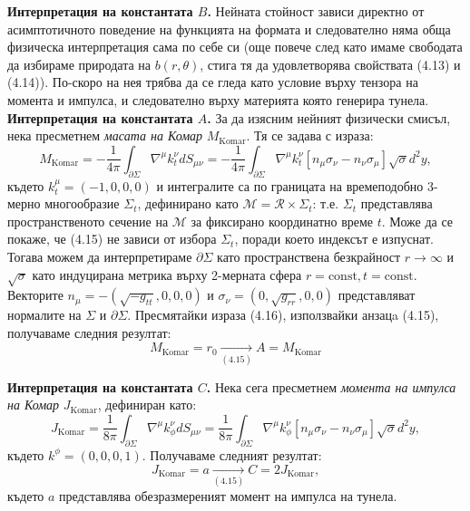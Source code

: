 \noindent\textbf{Интерпретация на константата $B$.} Нейната стойност зависи директно от асимптотичното поведение на функцията на формата и следователно няма обща физическа интерпретация сама по себе си (още повече след като имаме свободата да избираме природата на $b(r,\theta)$, стига тя да удовлетворява свойствата (4.13) и (4.14)). По-скоро на нея трябва да се гледа като условие върху тензора на момента и импулса, и следователно върху материята която генерира тунела.\\

\noindent\textbf{Интерпретация на константата $A$.} За да изясним нейният физически смисъл, нека пресметнем \emph{масата на Комар} $M_{\text{Komar}}$. Тя се задава с израза:
\begin{equation}
	M_{\text{Komar}} = -\frac{1}{4\pi}\int_{\partial\Sigma}\nabla^\mu k^\nu_t dS_{\mu\nu} =  -\frac{1}{4\pi}\int_{\partial\Sigma}\nabla^\mu k^\nu_t\left[n_\mu\sigma_\nu - n_\nu\sigma_\mu\right] \sqrt{\sigma}d^2y,
\end{equation}
където $k^\mu_t = (-1,0,0,0)$ и интегралите са по границата на времеподобно 3-мерно многообразие $\Sigma_t$, дефинирано като $\mathcal{M} = \mathcal{R} \times \Sigma_t$: т.е. $\Sigma_t$ представлява пространственото сечение на $\mathcal{M}$ за фиксирано координатно време $t$. Може да се покаже, че (4.15) не зависи от избора $\Sigma_t$, поради което индексът е изпуснат. Тогава можем да интерпретираме $\partial\Sigma$ като пространствена безкрайност $r\rightarrow\infty$ и $\sqrt{\sigma}$ като индуцирана метрика върху 2-мерната сфера $r = \text{const}, t = \text{const}$. Векторите $n_\mu = - (\sqrt{-g_{tt}}, 0, 0, 0)$ и $\sigma_\nu = (0, \sqrt{g_{rr}},0 ,0)$ представляват нормалите на $\Sigma$ и $\partial\Sigma$. Пресмятайки израза (4.16), използвайки анзацa (4.15), получаваме следния резултат:
\begin{equation}
	M_{\text{Komar}} = r_0 \xrightarrow[(4.15)]{} A = M_{\text{Komar}}
\end{equation}

\noindent\textbf{Интерпретация на константата $C$.} Нека сега пресметнем \emph{момента на импулса на Комар} $J_{\text{Komar}}$, дефиниран като:
\begin{equation}
	J_{\text{Komar}} = \frac{1}{8\pi}\int_{\partial\Sigma}\nabla^\mu k^\nu_\phi dS_{\mu\nu} = \frac{1}{8\pi}\int_{\partial\Sigma}\nabla^\mu k^\nu_\phi\left[n_\mu\sigma_\nu - n_\nu\sigma_\mu\right] \sqrt{\sigma}d^2y,
\end{equation}
където $k^\phi = (0, 0, 0, 1)$. Получаваме следният резултат:
\begin{equation}
	J_\text{Komar} = a\xrightarrow[(4.15)]{} C = 2J_\text{Komar}, 
\end{equation}
където $a$ представлява обезразмереният момент на импулса на тунела.
